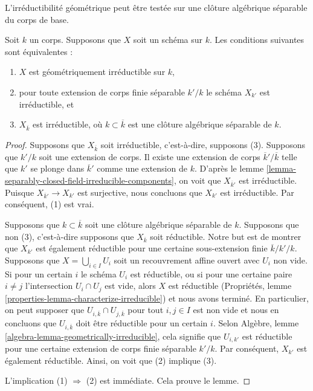 \begin{lemma}
\label{lemma-characterize-geometrically-irreducible}
\begin{slogan}
L'irréductibilité géométrique peut être testée sur
une clôture algébrique séparable du corps de base.
\end{slogan}
Soit $k$ un corps. Supposons que $X$
soit un schéma sur $k$. Les conditions suivantes sont équivalentes :
\begin{enumerate}
\item $X$ est géométriquement irréductible sur $k$,
\item pour toute extension de corps finie séparable
$k'/k$ le schéma $X_{k'}$ est irréductible, et \item
$X_{\overline{k}}$ est irréductible, où $k \subset
\overline{k}$ est une clôture algébrique séparable de $k$.
\end{enumerate}
\end{lemma}

\begin{proof}
Supposons que $X_{\overline{k}}$ soit irréductible, c'est-à-dire,
supposons (3). Supposons que $k'/k$ soit une extension de corps.
Il existe une extension de corps $\overline{k}'/\overline{k}$
telle que $k'$ se plonge dans $\overline{k}'$ comme une extension
de $k$. D'après le lemme
\ref{lemma-separably-closed-field-irreducible-components}, on voit que
$X_{\overline{k}'}$ est irréductible. Puisque $X_{\overline{k}'} \to X_{k'}$ est
surjective, nous concluons que $X_{k'}$ est irréductible. Par conséquent, (1) est vrai.

\medskip\noindent
Supposons que $k \subset \overline{k}$ soit une clôture
algébrique séparable de $k$. Supposons que non (3),
c'est-à-dire supposons que $X_{\overline{k}}$ soit
réductible. Notre but est de montrer que $X_{k'}$ est
également réductible pour une certaine sous-extension
finie $\overline{k}/k'/k$. Supposons que $X = \bigcup_{i
\in I} U_i$ soit un recouvrement affine ouvert avec $U_i$
non vide. Si pour un certain $i$ le schéma $U_i$ est
réductible, ou si pour une certaine paire $i \not = j$
l'intersection $U_i \cap U_j$ est vide, alors $X$ est
réductible (Propriétés, lemme
\ref{properties-lemma-characterize-irreducible}) et nous
avons terminé. En particulier, on peut supposer que
$U_{i, \overline{k}} \cap U_{j, \overline{k}}$ pour tout $i, j
\in I$ est non vide et nous en concluons que $U_{i,
\overline{k}}$ doit être réductible pour un certain $i$. Selon
Algèbre, lemme \ref{algebra-lemma-geometrically-irreducible},
cela signifie que $U_{i, k'}$ est réductible pour une certaine
extension de corps finie séparable $k'/k$. Par conséquent, $X_{k'}$
est également réductible. Ainsi, on voit que (2) implique (3).

\medskip\noindent
L'implication (1) $\Rightarrow$ (2)
est immédiate. Cela prouve le lemme.
\end{proof}


